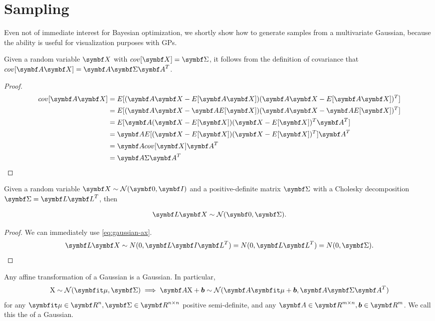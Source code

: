 \section{Sampling}

Even not of immediate interest for Bayesian optimization, we shortly show
how to generate samples from a multivariate Gaussian, because the ability is useful for
visualization purposes with GPs.

\begin{thm}
  Given a random variable $\mX$ with $cov[\mX] = \mSigma$, it follows from
  the definition of covariance that $cov[\mA \mX] = \mA \mSigma \mA^T$.
\end{thm}

\begin{proof}
  \begin{align}
    cov[\mA \mX] &= E[(\mA \mX - E[\mA \mX])(\mA \mX - E[\mA \mX])^T] \\
                 &= E[(\mA \mX - \mA E[\mX])(\mA \mX - \mA E[\mX])^T] \\
                 &= E[\mA (\mX - E[\mX])(\mX - E[\mX])^T \mA^T] \\
                 &= \mA E[(\mX - E[\mX])(\mX - E[\mX])^T] \mA^T \\
                 &= \mA cov[\mX] \mA^T \\
                 &= \mA \Sigma \mA^T
    \label{eq:gaussian-ax}
  \end{align}
\end{proof}

\begin{thm}
  Given a random variable $\mX \sim \gN(\mZero, \mI)$ and a positive-definite matrix
  $\mSigma$ with a Cholesky decomposition $\mSigma = \mL \mL^T$, then

  \begin{equation}
    \mL \mX \sim \gN(\mZero, \mSigma).
    \label{eq:gaussian-cholesky}
  \end{equation}
\end{thm}

\begin{proof}
  We can immediately use \autoref{eq:gaussian-ax}.
  \begin{align}
    \mL \mX \sim N(0, \mL \mI \mL^T) = N(0, \mL \mL^T) = N(0, \mSigma).
  \end{align}
\end{proof}

\begin{thm}
  Any affine transformation of a Gaussian is a Gaussian. In particular,
  $$
    \rX \sim \gN(\vmu, \mSigma) \implies \mA \rX + \vb \sim \gN(\mA \vmu + \vb, \mA \mSigma \mA^T)
  $$
  for any $\vmu \in \mR^n, \mSigma \in \mR^{n \times n}$ positive
  semi-definite, and any $\mA \in \mR^{m \times n}, \vb \in \mR^m$.
  We call this the  of a Gaussian.
\end{thm}

